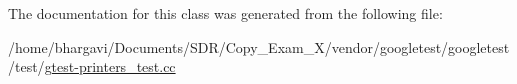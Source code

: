 The documentation for this class was generated from the following file\+:\begin{DoxyCompactItemize}
\item 
/home/bhargavi/\+Documents/\+S\+D\+R/\+Copy\+\_\+\+Exam\+\_\+X/vendor/googletest/googletest/test/\hyperlink{gtest-printers__test_8cc}{gtest-\/printers\+\_\+test.\+cc}\end{DoxyCompactItemize}
